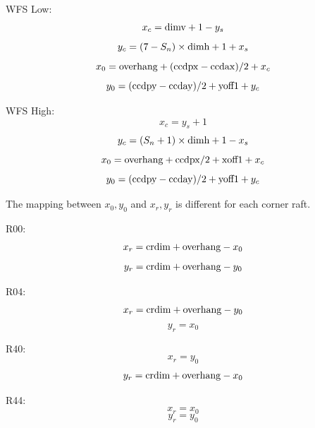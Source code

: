 \documentclass{article}[12pt]
\begin{document}
{WFS Low:
\begin{equation}
x_c = {\rm dimv} + 1 - y_s
\end{equation}
\begin{equation}
y_c = (7 - S_n) \times {\rm dimh} + 1+ x_s
\end{equation}
\begin{equation}
x_0 = {\rm overhang} + ({\rm ccdpx} - {\rm ccdax})/2 + x_c 
\end{equation}
\begin{equation}
y_0 = ({\rm ccdpy} - {\rm ccday})/2 + {\rm yoff1} + y_c
\end{equation}

WFS High:
\begin{equation}
x_c = y_s + 1
\end{equation}
\begin{equation}
y_c = (S_n  + 1) \times {\rm dimh} + 1 - x_s
\end{equation}
\begin{equation}
x_0 = {\rm overhang} +  {\rm ccdpx}/2 + {\rm xoff1} + x_c
\end{equation}
\begin{equation}
y_0 = ({\rm ccdpy} - {\rm ccday})/2 + {\rm yoff1} + y_c
\end{equation}

The mapping between $x_0, y_0$ and $x_r, y_r$ is different for each corner raft.

R00:
\begin{equation}
x_r = {\rm crdim} + {\rm overhang} - x_0
\end{equation}
\begin{equation}
y_r = {\rm crdim} + {\rm overhang} - y_0
\end{equation}

R04:
\begin{equation}
x_r = {\rm crdim} + {\rm overhang} - y_0
\end{equation}
\begin{equation}
y_r = x_0
\end{equation}

R40:
\begin{equation}
x_r = y_0
\end{equation}
\begin{equation}
y_r = {\rm crdim} + {\rm overhang} - x_0
\end{equation}

R44:
\begin{equation}
x_r = x_0
\end{equation}
\begin{equation}
y_r = y_0
\end{equation}

}
\end{document}
